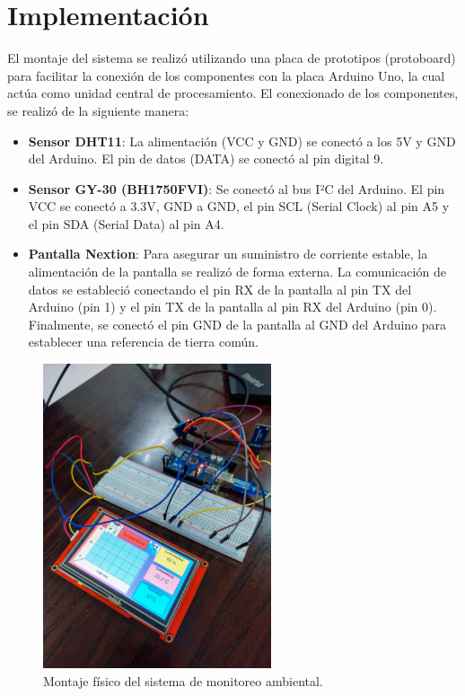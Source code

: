 \section{Implementación}
El montaje del sistema se realizó utilizando una placa de prototipos (protoboard) para facilitar la conexión de los componentes con la placa Arduino Uno, la cual actúa como unidad central de procesamiento.
El conexionado de los componentes, se realizó de la siguiente manera:

\begin{itemize}
    \item \textbf{Sensor DHT11}: La alimentación (VCC y GND) se conectó a los 5V y GND del Arduino. El pin de datos (DATA) se conectó al pin digital 9. 
    
    \item \textbf{Sensor GY-30 (BH1750FVI)}: Se conectó al bus I²C del Arduino. El pin VCC se conectó a 3.3V, GND a GND, el pin SCL (Serial Clock) al pin A5 y el pin SDA (Serial Data) al pin A4.
    
    \item \textbf{Pantalla Nextion}: Para asegurar un suministro de corriente estable, la alimentación de la pantalla se realizó de forma externa. La comunicación de datos se estableció conectando el pin RX de la pantalla al pin TX del Arduino (pin 1) y el pin TX de la pantalla al pin RX del Arduino (pin 0). Finalmente, se conectó el pin GND de la pantalla al GND del Arduino para establecer una referencia de tierra común.
\end{itemize}

\begin{figure}[H]
    \centering
    \includegraphics[width=0.6\textwidth]{Diagramas/impl.jpg} 
    \caption{Montaje físico del sistema de monitoreo ambiental.}
    \label{fig:montaje}
\end{figure}